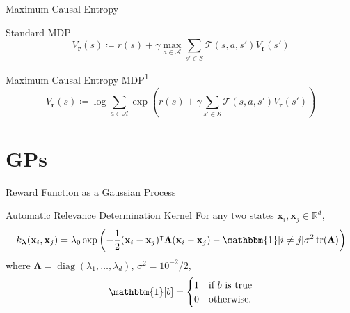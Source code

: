 \documentclass{beamer}
\DeclareMathOperator{\diag}{diag}
\DeclareMathOperator{\tr}{tr}
\begin{document}
\begin{frame}{Maximum Causal Entropy}
  \begin{minipage}[t]{\textwidth}
    \begin{block}{Standard MDP}
      \[
        V_{\mathbf{r}}(s) \coloneqq r(s) + \gamma \max_{a \in \mathcal{A}}
        \sum_{s' \in \mathcal{S}} \mathcal{T}(s, a, s')V_{\mathbf{r}}(s')
      \]
    \end{block}
    \begin{block}{Maximum Causal Entropy MDP\textsuperscript{1}}
      \[
        V_{\mathbf{r}}(s) \coloneqq \log \sum_{a \in \mathcal{A}} \exp \left(
          r(s) + \gamma\sum_{s' \in \mathcal{S}} \mathcal{T}(s, a,
          s')V_{\mathbf{r}}(s') \right)
      \]
    \end{block}
    \vspace{1cm}
  \end{minipage}
\end{frame}

\section{GPs}

\begin{frame}{Reward Function as a Gaussian Process}
  \begin{block}{Automatic Relevance Determination Kernel}
    For any two states $\mathbf{x}_i, \mathbf{x}_j \in \mathbb{R}^d$,
    \[
      k_{\bm\lambda}(\mathbf{x}_i, \mathbf{x}_j) = \lambda_0\exp\left(
        -\frac{1}{2}(\mathbf{x}_i - \mathbf{x}_j)^\intercal\bm\Lambda(\mathbf{x}_i -
        \mathbf{x}_j) - \mathbbm{1}[i \ne j]\sigma^2\tr(\bm\Lambda) \right)
    \]
    where $\bm\Lambda = \diag(\lambda_1, \dots, \lambda_d)$, $\sigma^2 =
    10^{-2}/2$,
    \[
      \mathbbm{1}[b] = \begin{cases}
        1 & \mbox{if $b$ is true} \\
        0 & \mbox{otherwise}.
      \end{cases}
    \]
  \end{block}
\end{frame}
\end{document}
